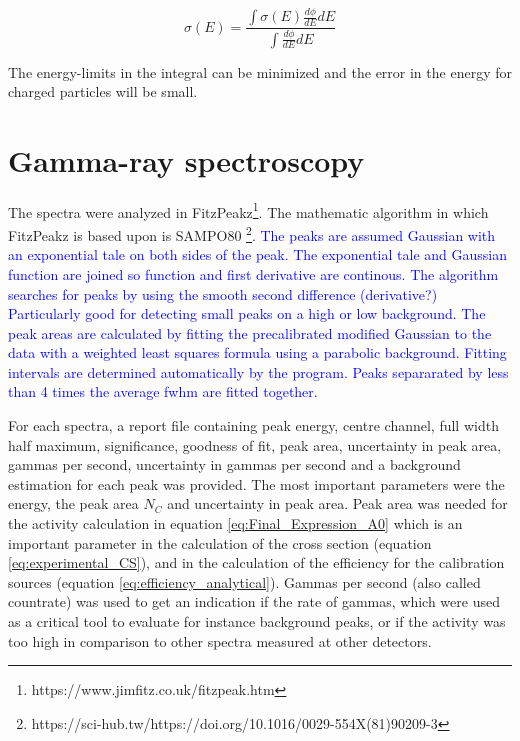 \documentclass[a4paper,11pt,twoside]{book}
\begin{document}
\begin{equation}
    \sigma(E) = \frac{\int \sigma(E) \frac{d\phi}{dE}dE}{\int \frac{d\phi}{dE}dE}
\end{equation}

The energy-limits in the integral can be minimized and the error in the energy for charged particles will be small. \\


\section{Gamma-ray spectroscopy}
The spectra were analyzed in FitzPeakz\footnote{https://www.jimfitz.co.uk/fitzpeak.htm}. The mathematic algorithm in which FitzPeakz is based upon is SAMPO80 \footnote{https://sci-hub.tw/https://doi.org/10.1016/0029-554X(81)90209-3}. \textcolor{blue}{The peaks are assumed Gaussian with an exponential tale on both sides of the peak. The exponential tale and Gaussian function are joined so function and first derivative are continous. The algorithm searches for peaks by using the smooth second difference (derivative?) Particularly good for detecting small peaks on a high or low background. The peak areas are calculated by fitting the precalibrated modified Gaussian to the data with a weighted least squares formula using a parabolic background. Fitting intervals are determined automatically by the program. Peaks separarated by less than 4 times the average fwhm are fitted together. }

For each spectra,  a report file containing peak energy, centre channel, full width half maximum, significance, goodness of fit, peak area, uncertainty in peak area, gammas per second, uncertainty in gammas per second and a background estimation for each peak was provided. The most important parameters were the energy, the peak area $N_C$ and uncertainty in peak area. Peak area was needed for the activity calculation in equation \ref{eq:Final_Expression_A0} which is an important parameter in the calculation of the cross section (equation \ref{eq:experimental_CS}), and in the calculation of the efficiency for the calibration sources (equation \ref{eq:efficiency_analytical}). Gammas per second (also called countrate) was used to get an indication if the rate of gammas, which were used as a critical tool to evaluate for instance background peaks, or if the activity was too high in comparison to other spectra measured at other detectors.  
\end{document}
